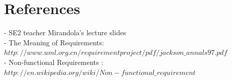 \documentclass[12pt]{book}
\begin{document}
\chapter{References}

- SE2 teacher Mirandola's lecture slides \\ 
- The Meaning of Requirements: \\$http://www.uml.org.cn/requirementproject/pdf/jackson\_annals97.pdf$ \\
- Non-functional Requirements : \\$http://en.wikipedia.org/wiki/Non-functional\_requirement$
\end{document}
